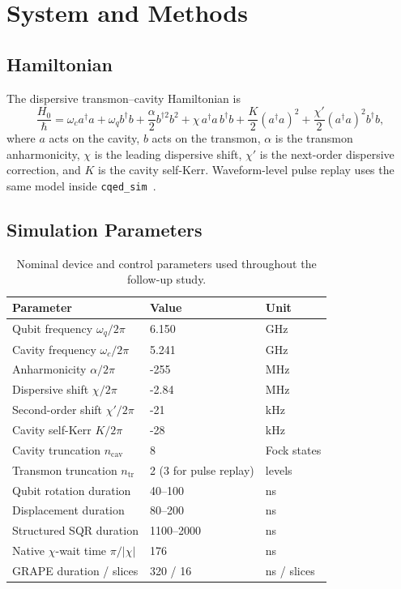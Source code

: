 \documentclass[11pt, a4paper]{article}
\begin{document}
\section{System and Methods}
\label{sec:methods}

\subsection{Hamiltonian}

The dispersive transmon--cavity Hamiltonian is
\begin{equation}
\frac{H_0}{\hbar} =
\omega_c a^\dagger a
+ \omega_q b^\dagger b
+ \frac{\alpha}{2} b^{\dagger 2} b^2
+ \chi\, a^\dagger a\, b^\dagger b
+ \frac{K}{2} (a^\dagger a)^2
+ \frac{\chi'}{2} (a^\dagger a)^2 b^\dagger b ,
\end{equation}
where $a$ acts on the cavity, $b$ acts on the transmon, $\alpha$ is the transmon anharmonicity, $\chi$ is the leading dispersive shift, $\chi'$ is the next-order dispersive correction, and $K$ is the cavity self-Kerr. Waveform-level pulse replay uses the same model inside \texttt{cqed\_sim}~\cite{cqed_sim}.

\subsection{Simulation Parameters}

\begin{table}[H]
\centering
\caption{Nominal device and control parameters used throughout the follow-up study.}
\begin{tabular}{@{} l l l @{}}
\toprule
Parameter & Value & Unit \\
\midrule
Qubit frequency $\omega_q/2\pi$ & 6.150 & GHz \\
Cavity frequency $\omega_c/2\pi$ & 5.241 & GHz \\
Anharmonicity $\alpha/2\pi$ & -255 & MHz \\
Dispersive shift $\chi/2\pi$ & -2.84 & MHz \\
Second-order shift $\chi'/2\pi$ & -21 & kHz \\
Cavity self-Kerr $K/2\pi$ & -28 & kHz \\
Cavity truncation $n_\mathrm{cav}$ & 8 & Fock states \\
Transmon truncation $n_\mathrm{tr}$ & 2 (3 for pulse replay) & levels \\
Qubit rotation duration & 40--100 & ns \\
Displacement duration & 80--200 & ns \\
Structured SQR duration & 1100--2000 & ns \\
Native $\chi$-wait time $\pi/|\chi|$ & 176 & ns \\
GRAPE duration / slices & 320 / 16 & ns / slices \\
\bottomrule
\end{tabular}
\end{table}
\end{document}
